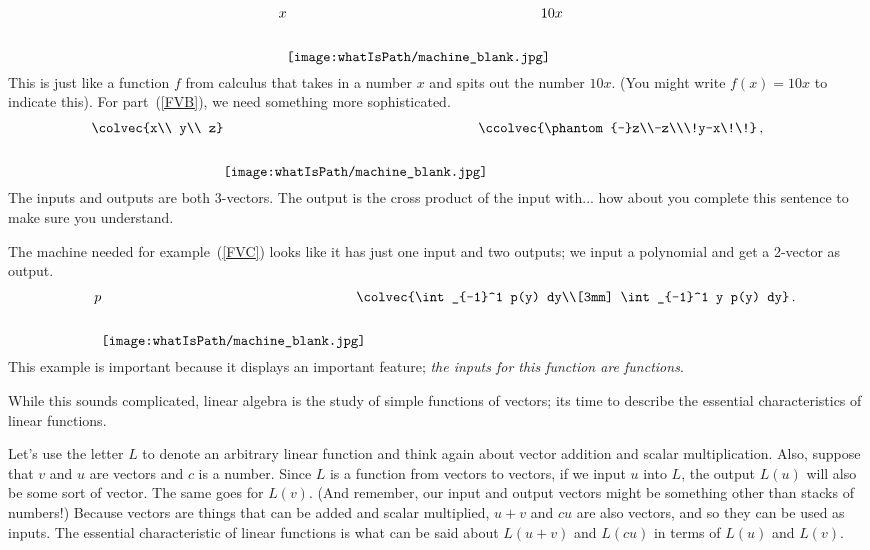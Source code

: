 \[x \raisebox{-11mm}{\texttt{[image: \\whatIsPath/machine\_blank.jpg]} }\! \! \!\! \! \!10 x\, \hspace{8mm}\]
This is just like a function $f$ from calculus that takes in a number $x$ and spits out the number $10x$. (You might write $f(x)=10x$ to indicate this).
For part~(\ref{FVB}), we need something more sophisticated. 
\[\!\!\!\!\!\!\!\!\!\colvec{x\\ y\\ z} \raisebox{-11mm}{\texttt{[image: \\whatIsPath/machine\_blank.jpg]} }\! \! \!\! \! \!\ccolvec{\phantom{-}z\\-z\\\!y-x\!\!}\, ,\]
The inputs and outputs are both 3-vectors. The output is the cross product of the input with... how about you complete this sentence to make sure you understand.

The machine needed for example~(\ref{FVC}) looks like it has just one input and two outputs; we input a polynomial and get a 2-vector as output.
\[\quad p \raisebox{-11mm}{\texttt{[image: \\whatIsPath/machine\_blank.jpg]} }\! \! \!\! \! \!\colvec{\int_{-1}^1  p(y) dy\\[3mm]
\int_{-1}^1 y p(y) dy}\, .\]
This example is important because it displays an important feature; 
{\itshape the inputs for this function are functions}.

While this sounds complicated, %
linear algebra is the
study of %
simple %
functions of vectors; its time to describe the essential characteristics of linear functions. 

Let's use the letter $L$ to denote an arbitrary linear function and think again about vector addition and scalar multiplication. 
Also,  suppose that $v$ and $u$ are vectors and $c$ is a number. 
Since $L$ is a function from vectors to vectors, if we input $u$ into $L$, the output $L(u)$ will also be some sort of vector. 
The same goes for 
$L(v)$.
(And remember, our input and output vectors might be something other than stacks of numbers!) 
Because vectors are things that can be added and scalar multiplied, 
$u+v$ and $cu$ are also vectors, and so they can be used as inputs.
The essential characteristic of linear functions is what can be said about 
$L(u+v)$ and $L(cu)$ in terms of 
$L(u)$ and $L(v)$. 

